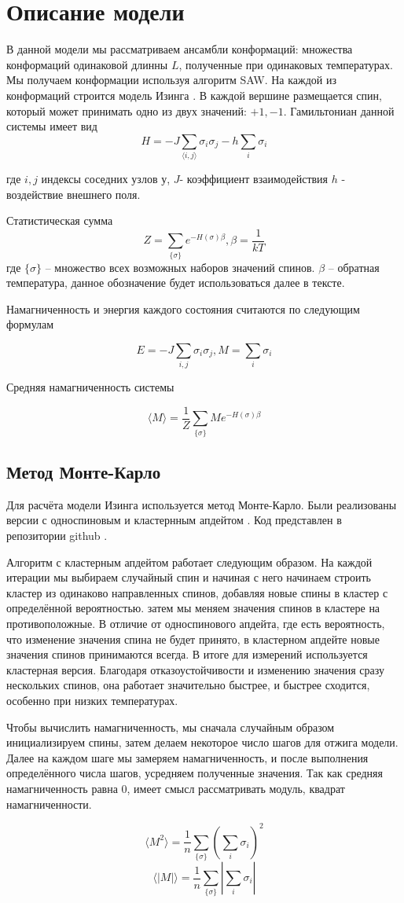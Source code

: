 \section{Описание модели}

В данной модели мы рассматриваем ансамбли конформаций: множества конформаций одинаковой длинны $L$, полученные при одинаковых температурах. Мы получаем конформации используя алгоритм SAW.
На каждой из конформаций строится модель Изинга \cite{ising}. В каждой вершине размещается спин, который может принимать одно из двух значений: $+1, -1$.
Гамильтониан данной системы имеет вид
\[H = -J\sum_{\langle i, j\rangle}{\sigma_i\sigma_j} - h\sum_i{\sigma_i} \]

где $i, j$ индексы соседних узлов у, $J$- коэффициент взаимодействия $h$ - воздействие внешнего поля.

Статистическая сумма
\[Z = \sum_{\{\sigma\}} e^{-H(\sigma)\beta}, \beta = \frac{1}{kT}\]
где $\{\sigma\}$ -- множество всех возможных наборов значений спинов. $\beta$ -- обратная температура, данное обозначение будет использоваться далее в тексте.

Намагниченность и энергия каждого состояния считаются по следующим формулам

\[ 
E = -J\sum_{i, j} \sigma_i \sigma_j, 
M = \sum_i \sigma_i
\]

Средняя намагниченность системы

\[
\langle M \rangle = \frac{1}{Z}  \sum_{\{\sigma\}} M e^{-H(\sigma)\beta}
\]

\subsection{Метод Монте-Карло}
Для расчёта модели Изинга используется метод Монте-Карло. Были реализованы версии с односпиновым и кластернным апдейтом \cite{wolf_algorithm}. Код представлен в репозитории github \cite{github}. 

Алгоритм с кластерным апдейтом работает следующим образом. На каждой итерации мы выбираем случайный спин и начиная с него начинаем строить кластер из одинаково направленных спинов, добавляя новые спины в кластер с определённой вероятностью. затем мы меняем значения спинов в кластере на противоположные. В отличие от односпинового апдейта, где есть вероятность, что изменение значения спина не будет принято, в кластерном апдейте новые значения спинов принимаются всегда.
В итоге для измерений используется кластерная версия. Благодаря отказоустойчивости и изменению значения сразу нескольких спинов, она работает значительно быстрее, и быстрее сходится, особенно при низких температурах.

Чтобы вычислить намагниченность, мы сначала случайным образом инициализируем спины, затем делаем некоторое число шагов для отжига модели. Далее на каждом шаге мы замеряем намагниченность, и после выполнения определённого числа шагов, усредняем полученные значения. Так как средняя намагниченность равна 0, имеет смысл рассматривать модуль, квадрат намагниченности.

\[
\langle M^2\rangle = \frac{1}{n} \sum_{\{\sigma\}} \left( \sum_i \sigma_i \right)^2
\]
\[
\langle |M|\rangle = \frac{1}{n} \sum_{\{\sigma\}} \left| \sum_i \sigma_i \right|
\]